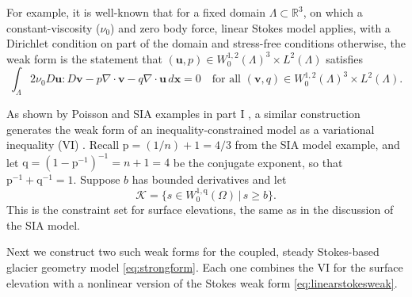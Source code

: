 \documentclass[letterpaper,final,12pt,reqno]{amsart}
\theoremstyle{claim}
\newcommand{\RR}{\mathbb{R}}
\newcommand{\Div}{\nabla\cdot}
\newcommand{\bu}{\mathbf{u}}
\newcommand{\bv}{\mathbf{v}}
\newcommand{\bx}{\mathbf{x}}
\newcommand{\pp}{{\text{p}}}
\newcommand{\qq}{{\text{q}}}
\numberwithin{equation}{section}
\numberwithin{figure}{section}
\numberwithin{table}{section}
\numberwithin{theorem}{section}
\begin{document}
For example, it is well-known \cite[for example]{Elmanetal2014} that for a fixed domain $\Lambda \subset \RR^3$, on which a constant-viscosity ($\nu_0$) and zero body force, linear Stokes model applies, with a Dirichlet condition on part of the domain and stress-free conditions otherwise, the weak form is the statement that $(\bu,p) \in W_0^{1,2}(\Lambda)^3 \times L^2(\Lambda)$ satisfies
\begin{equation}
\int_\Lambda 2 \nu_0 D\bu : D\bv - p \Div\bv - q \Div\bu\,d\bx = 0 \quad \text{for all } (\bv,q) \in W_0^{1,2}(\Lambda)^3 \times L^2(\Lambda).  \label{eq:linearstokesweak}
\end{equation}

As shown by Poisson and SIA examples in part I \cite{Bueler2022partI}, a similar construction generates the weak form of an inequality-constrained model as a variational inequality (VI) \cite{KinderlehrerStampacchia1980}.  Recall $\pp=(1/n)+1=4/3$ from the SIA model example, and let $\qq=(1-\pp^{-1})^{-1}=n+1=4$ be the conjugate exponent, so that $\pp^{-1}+\qq^{-1}=1$.  Suppose $b$ has bounded derivatives and let
\begin{equation}
\mathcal{K} = \{s \in W_0^{1,\qq}(\Omega) \,|\, s \ge b\}.  \label{eq:Kconstraintset}
\end{equation}
This is the constraint set for surface elevations, the same as in the discussion of the SIA model.

Next we construct two such weak forms for the coupled, steady Stokes-based glacier geometry model \eqref{eq:strongform}.  Each one combines the VI for the surface elevation with a nonlinear version of the Stokes weak form \eqref{eq:linearstokesweak}.
\end{document}
